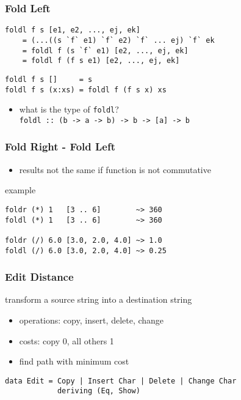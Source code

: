 \documentclass[dvipsnames]{beamer}
\theoremstyle{plain}
\begin{document}
\begin{frame}[fragile]
  \frametitle{Fold Left}

  \begin{block}{}
    \begin{lstlisting}
foldl f s [e1, e2, ..., ej, ek]
    = (...((s `f` e1) `f` e2) `f` ... ej) `f` ek
    = foldl f (s `f` e1) [e2, ..., ej, ek]
    = foldl f (f s e1) [e2, ..., ej, ek]
    \end{lstlisting}
  \end{block}

  \pause
  \begin{exampleblock}{}
    \begin{lstlisting}[deletekeywords={foldl}]
foldl f s []     = s
foldl f s (x:xs) = foldl f (f s x) xs
    \end{lstlisting}
  \end{exampleblock}

  \pause
  \begin{itemize}
    \item what is the type of \lstinline|foldl|?\\
      \lstinline|foldl :: (b -> a -> b) -> b -> [a] -> b|
  \end{itemize}
\end{frame}

\begin{frame}[fragile]
  \frametitle{Fold Right - Fold Left}

  \begin{itemize}
    \item results not the same if function is not commutative
  \end{itemize}

  \begin{exampleblock}{example}
    \begin{lstlisting}
foldr (*) 1   [3 .. 6]        ~> 360
foldl (*) 1   [3 .. 6]        ~> 360

foldr (/) 6.0 [3.0, 2.0, 4.0] ~> 1.0
foldl (/) 6.0 [3.0, 2.0, 4.0] ~> 0.25
    \end{lstlisting}
  \end{exampleblock}
\end{frame}

\begin{frame}[fragile]
  \frametitle{Edit Distance}

  \begin{exampleblock}{transform a source string into a destination string}
    \begin{itemize}
      \item operations: copy, insert, delete, change
      \item costs: copy 0, all others 1
      \item find path with minimum cost
    \end{itemize}

    \begin{lstlisting}
data Edit = Copy | Insert Char | Delete | Change Char
            deriving (Eq, Show)
    \end{lstlisting}
  \end{exampleblock}
\end{frame}
\end{document}
